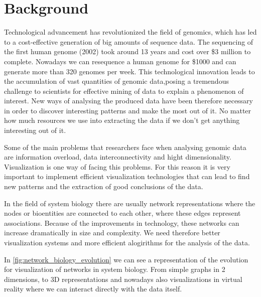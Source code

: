 \section{Background}
Technological advancement has revolutionized the field of genomics, which has led to a cost-effective generation of big amounts of sequence data. The sequencing of the first human genome (2002) took around 13 years and cost over \$3 million to complete. Nowadays we can resequence a human genome for \$1000 and can generate more than 320 genomes per week\cite{big_biological_impacts_bd}. This technological innovation leads to the accumulation of vast quantities of genomic data,posing a tremendous challenge to scientists for effective mining of data to explain a phenomenon of interest\cite{zhang_paciorkowski_craig_cui_2019}. New ways of analysing the produced data have been therefore necessary in order to discover interesting patterns  and make the most out of it. No matter how much resources we use into extracting the data if we don't get anything interesting out of it.

Some of the main problems that researchers face when analysing genomic data are information overload, data interconnectivity and hight dimensionality. Visualization is one way of facing this problems. For this reason it is very important to implement efficient visualization technologies that can lead to find new patterns and the extraction of good conclusions of the data.

In the field of system biology there are usually network representations where the nodes or bioentities are connected to each other, where these edges represent associations. Because of the improvements in technology, these networks can increase dramatically in size and complexity. We need therefore better visualization systems and more efficient alogirithms for the analysis of the data.

In \ref{fig:network_biology_evolution} we can see a representation of the evolution for visualization of networks in system biology. From simple graphs in 2 dimensions, to 3D representations and nowadays also visualizations in virtual reality where we can interact directly with the data itself.

